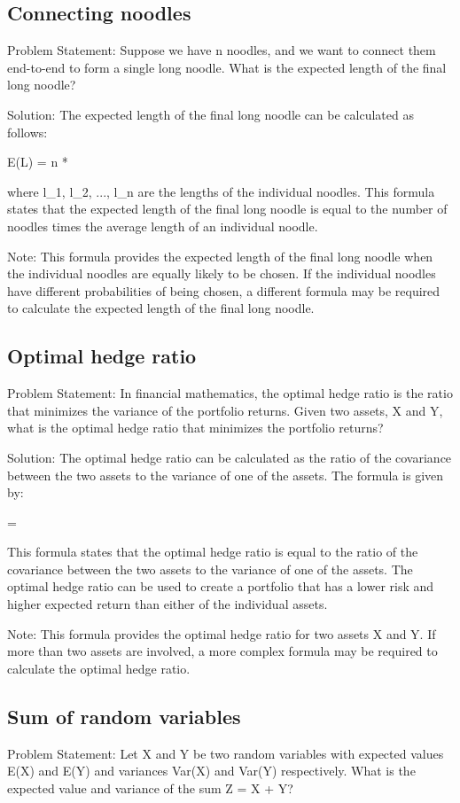 \documentclass[12pt, a4paper, oneside]{article}
\begin{document}
\subsection{ Connecting noodles }
Problem Statement:
Suppose we have n noodles, and we want to connect them end-to-end to form a single long noodle. What is the expected length of the final long noodle?

Solution:
The expected length of the final long noodle can be calculated as follows:

E(L) = n * 

where l_1, l_2, ..., l_n are the lengths of the individual noodles. This formula states that the expected length of the final long noodle is equal to the number of noodles times the average length of an individual noodle.

Note: This formula provides the expected length of the final long noodle when the individual noodles are equally likely to be chosen. If the individual noodles have different probabilities of being chosen, a different formula may be required to calculate the expected length of the final long noodle.
\subsection{ Optimal hedge ratio }
Problem Statement:
In financial mathematics, the optimal hedge ratio is the ratio that minimizes the variance of the portfolio returns. Given two assets, X and Y, what is the optimal hedge ratio that minimizes the portfolio returns?

Solution:
The optimal hedge ratio can be calculated as the ratio of the covariance between the two assets to the variance of one of the assets. The formula is given by:

 = 

This formula states that the optimal hedge ratio is equal to the ratio of the covariance between the two assets to the variance of one of the assets. The optimal hedge ratio can be used to create a portfolio that has a lower risk and higher expected return than either of the individual assets.

Note: This formula provides the optimal hedge ratio for two assets X and Y. If more than two assets are involved, a more complex formula may be required to calculate the optimal hedge ratio.
\subsection{ Sum of random variables }
Problem Statement:
Let X and Y be two random variables with expected values E(X) and E(Y) and variances Var(X) and Var(Y) respectively. What is the expected value and variance of the sum Z = X + Y?
\end{document}
